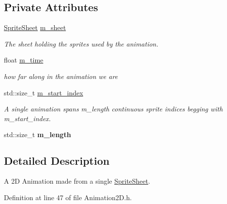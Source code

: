 \subsection*{Private Attributes}
\begin{DoxyCompactItemize}
\item 
\mbox{\label{classnta_1_1Animation2D_a7299c55bbae2e3a8eed7bbfde8362523}} 
\hyperlink{structnta_1_1SpriteSheet}{Sprite\+Sheet} \hyperlink{classnta_1_1Animation2D_a7299c55bbae2e3a8eed7bbfde8362523}{m\+\_\+sheet}
\begin{DoxyCompactList}\small\item\em The sheet holding the sprites used by the animation. \end{DoxyCompactList}\item 
\mbox{\label{classnta_1_1Animation2D_a24497412429334fe270a1b0ba6526203}} 
float \hyperlink{classnta_1_1Animation2D_a24497412429334fe270a1b0ba6526203}{m\+\_\+time}
\begin{DoxyCompactList}\small\item\em how far along in the animation we are \end{DoxyCompactList}\item 
\mbox{\label{classnta_1_1Animation2D_a61cdaf3599067dc1e2fe3b926b29b838}} 
std\+::size\+\_\+t \hyperlink{classnta_1_1Animation2D_a61cdaf3599067dc1e2fe3b926b29b838}{m\+\_\+start\+\_\+index}
\begin{DoxyCompactList}\small\item\em A single animation spans m\+\_\+length continuous sprite indices begging with m\+\_\+start\+\_\+index. \end{DoxyCompactList}\item 
\mbox{\label{classnta_1_1Animation2D_a7ad254603c0e4c081895989643f6aa9e}} 
std\+::size\+\_\+t {\bfseries m\+\_\+length}
\end{DoxyCompactItemize}


\subsection{Detailed Description}
A 2D Animation made from a single \hyperlink{structnta_1_1SpriteSheet}{Sprite\+Sheet}. 

Definition at line 47 of file Animation2\+D.\+h.



